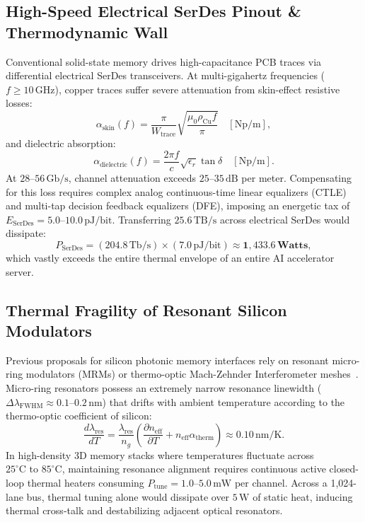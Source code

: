 \documentclass[journal]{IEEEtran}
\begin{document}
\subsection{High-Speed Electrical SerDes Pinout \& Thermodynamic Wall}
Conventional solid-state memory drives high-capacitance PCB traces via differential electrical SerDes transceivers. At multi-gigahertz frequencies ($f \ge 10\,\text{GHz}$), copper traces suffer severe attenuation from skin-effect resistive losses:
\begin{equation}
    \alpha_{\text{skin}}(f) = \frac{\pi}{W_{\text{trace}}} \sqrt{\frac{\mu_0 \rho_{\text{Cu}} f}{\pi}} \quad [\text{Np/m}],
\end{equation}
and dielectric absorption:
\begin{equation}
    \alpha_{\text{dielectric}}(f) = \frac{2\pi f}{c} \sqrt{\epsilon_r} \tan\delta \quad [\text{Np/m}].
\end{equation}
At $28\text{--}56\,\text{Gb/s}$, channel attenuation exceeds $25\text{--}35\,\text{dB}$ per meter. Compensating for this loss requires complex analog continuous-time linear equalizers (CTLE) and multi-tap decision feedback equalizers (DFE), imposing an energetic tax of $E_{\text{SerDes}} = 5.0\text{--}10.0\,\text{pJ/bit}$. Transferring $25.6\,\text{TB/s}$ across electrical SerDes would dissipate:
\begin{equation}
    P_{\text{SerDes}} = (204.8\,\text{Tb/s}) \times (7.0\,\text{pJ/bit}) \approx \mathbf{1,433.6\,\text{Watts}},
\end{equation}
which vastly exceeds the entire thermal envelope of an entire AI accelerator server.

\subsection{Thermal Fragility of Resonant Silicon Modulators}
Previous proposals for silicon photonic memory interfaces rely on resonant micro-ring modulators (MRMs) or thermo-optic Mach-Zehnder Interferometer meshes~\cite{bogaerts2020programmable}. Micro-ring resonators possess an extremely narrow resonance linewidth ($\Delta \lambda_{\text{FWHM}} \approx 0.1\text{--}0.2\,\text{nm}$) that drifts with ambient temperature according to the thermo-optic coefficient of silicon:
\begin{equation}
    \frac{d\lambda_{\text{res}}}{dT} = \frac{\lambda_{\text{res}}}{n_g} \left( \frac{\partial n_{\text{eff}}}{\partial T} + n_{\text{eff}} \alpha_{\text{therm}} \right) \approx 0.10\,\text{nm/K}.
\end{equation}
In high-density 3D memory stacks where temperatures fluctuate across $25^\circ\text{C}\text{ to }85^\circ\text{C}$, maintaining resonance alignment requires continuous active closed-loop thermal heaters consuming $P_{\text{tune}} = 1.0\text{--}5.0\,\text{mW}$ per channel. Across a 1,024-lane bus, thermal tuning alone would dissipate over $5\,\text{W}$ of static heat, inducing thermal cross-talk and destabilizing adjacent optical resonators.
\end{document}
